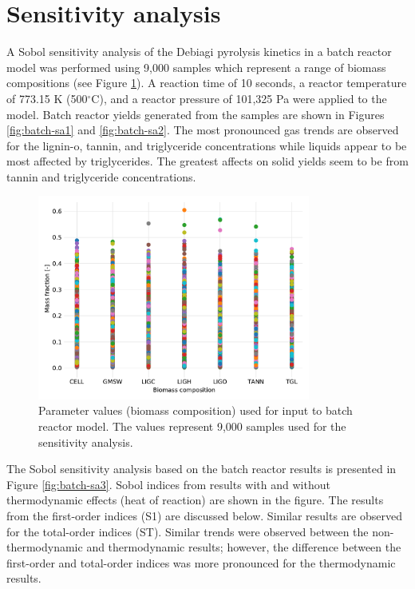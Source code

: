 
\section{Sensitivity analysis}

A Sobol sensitivity analysis of the Debiagi pyrolysis kinetics in a batch reactor model was performed using 9,000 samples which represent a range of biomass compositions (see Figure \ref{fig:sa-param-values}). A reaction time of 10 seconds, a reactor temperature of 773.15 K (500$^{\circ}$C), and a reactor pressure of 101,325 Pa were applied to the model. Batch reactor yields generated from the samples are shown in Figures \ref{fig:batch-sa1} and \ref{fig:batch-sa2}. The most pronounced gas trends are observed for the lignin-o, tannin, and triglyceride concentrations while liquids appear to be most affected by triglycerides. The greatest affects on solid yields seem to be from tannin and triglyceride concentrations.

\begin{figure}[H]
    \centering
    \includegraphics[width=0.8\textwidth]{figures/sa-param-values.pdf}
    \caption{Parameter values (biomass composition) used for input to batch reactor model. The values represent 9,000 samples used for the sensitivity analysis.}
    \label{fig:sa-param-values}
\end{figure}

The Sobol sensitivity analysis based on the batch reactor results is presented in Figure \ref{fig:batch-sa3}. Sobol indices from results with and without thermodynamic effects (heat of reaction) are shown in the figure. The results from the first-order indices (S1) are discussed below. Similar results are observed for the total-order indices (ST). Similar trends were observed between the non-thermodynamic and thermodynamic results; however, the difference between the first-order and total-order indices was more pronounced for the thermodynamic results.

